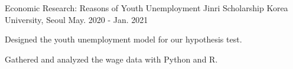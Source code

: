 \begin{cventries}
  \cventry
    {Economic Research: Reasons of Youth Unemployment} %
    {Jinri Scholarship} %
    {Korea University, Seoul} %
    {May. 2020 - Jan. 2021} %
    {
      \begin{cvitems} %
        \item {Designed the youth unemployment model for our hypothesis test.}
        \item {Gathered and analyzed the wage data with Python and R.}
      \end{cvitems}
    }

\end{cventries}
